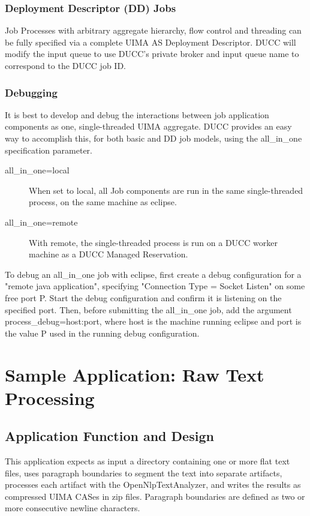 \subsection{Deployment Descriptor (DD) Jobs}
Job Processes with arbitrary aggregate hierarchy, flow control and threading can be fully specified
via a complete UIMA AS Deployment Descriptor. DUCC will modify the input queue to use DUCC's private
broker and input queue name to correspond to the DUCC job ID.

\subsection{Debugging}
It is best to develop and debug the interactions between job application components as one, 
single-threaded UIMA aggregate. DUCC provides an easy way to accomplish this, for both basic
and DD job models, using the all\_in\_one specification parameter.

\begin{description}
    \item[all\_in\_one=local] When set to local, all Job components are run in the same
      single-threaded process, on the same machine as eclipse.
    \item[all\_in\_one=remote] With remote, the single-threaded process is run on a DUCC
      worker machine as a DUCC Managed Reservation. 
\end{description}

To debug an all\_in\_one job with eclipse, first create a debug configuration for a
"remote java application", specifying "Connection Type = Socket Listen" on some
free port P. Start the debug configuration and confirm it is listening on the specified port.
Then, before submitting the all\_in\_one job, add the argument process\_debug=host:port, 
where host is the machine running eclipse and port is
the value P used in the running debug configuration.


\chapter{Sample Application: Raw Text Processing}

\section{Application Function and Design}
This application expects as input a directory containing one or more flat text files, 
uses paragraph boundaries to segment the text into separate artifacts, 
processes each artifact with the OpenNlpTextAnalyzer, and writes
the results as compressed UIMA CASes in zip files. Paragraph boundaries are defined as
two or more consecutive newline characters.

